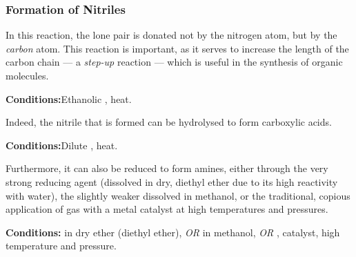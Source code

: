 			\pagebreak
			\subsubsection{Formation of Nitriles}

				In this reaction, the lone pair is donated not by the nitrogen atom, but by the \textit{carbon} atom. This reaction is
				important, as it serves to increase the length of the carbon chain –– a \textit{step-up} reaction –– which is useful
				in the synthesis of organic molecules.

				\vspace{1.5em}
				\vbox{\textbf{Conditions:}\tabto{35mm}Ethanolic , heat.}


				Indeed, the nitrile that is formed can be hydrolysed to form carboxylic acids.

				\vspace{1.5em}
				\vbox{\textbf{Conditions:}\tabto{35mm}Dilute , heat.}



				Furthermore, it can also be reduced to form amines, either through the very strong reducing agent 
				(dissolved in dry, diethyl ether due to its high reactivity with water), the slightly weaker  dissolved in
				methanol, or the traditional, copious application of  gas with a metal catalyst at high temperatures and pressures.

				\vspace{1.5em}
				\vbox{\textbf{Conditions:}	\tabto{35mm} in dry ether (diethyl ether), \textit{OR}
											\tabto{35mm}\ch{NaBH4} in methanol, \textit{OR}
											\tabto{35mm},  catalyst, high temperature and pressure.}



